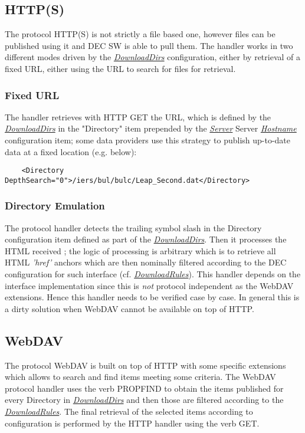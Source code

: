 \documentclass[dec_sum_main.tex]{subfiles}
\begin{document}
\subsection{HTTP(S)}
The protocol HTTP(S) is not strictly a file based one, however files can be published using it and DEC SW is able to pull them. The handler works in two different modes driven by the \hyperref[DownloadDirs]{\textit{DownloadDirs}} configuration, either by retrieval of a fixed URL, either using the URL to search for files for retrieval.

\subsubsection{Fixed URL}
The handler retrieves with HTTP GET the URL, which is defined by the \hyperref[DownloadDirs]{\textit{DownloadDirs}} in the "Directory" item prepended by the \hyperref[Config_Server]{\textit{Server}} Server \hyperref[Hostname]{\textit{Hostname}} configuration item; some data providers use this strategy to publish up-to-date data at a fixed location (e.g. below):

\begin{Verbatim}
	<Directory DepthSearch="0">/iers/bul/bulc/Leap_Second.dat</Directory>
\end{Verbatim}

\subsubsection{Directory Emulation}
The protocol handler detects the trailing symbol slash in the Directory configuration item defined as part of the \hyperref[DownloadDirs]{\textit{DownloadDirs}}. Then it processes the HTML received ; the logic of processing is arbitrary which is to retrieve all HTML \textit{'href'} anchors which are then nominally filtered according to the DEC configuration for such interface (cf. \hyperref[DownloadRules]{\textit{DownloadRules}}).
This handler depends on the interface implementation since this is \textit{not} protocol independent as the WebDAV extensions. Hence this handler needs to be verified case by case. In general this is a dirty solution when WebDAV cannot be available on top of HTTP.

\subsection{WebDAV}
The protocol WebDAV is built on top of HTTP with some specific extensions which allows to search and find items meeting some criteria. The WebDAV protocol handler uses the verb PROPFIND to obtain the items published for every Directory in \hyperref[DownloadDirs]{\textit{DownloadDirs}} and then those are filtered according to the \hyperref[DownloadRules]{\textit{DownloadRules}}.
The final retrieval of the selected items according to configuration is performed by the HTTP handler using the verb GET.
\end{document}
